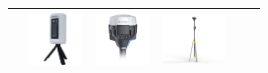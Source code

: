 \begin{table}[ht]
\begin{tabular}{|c|c|c|c|c|c|}
        \midrule\addlinespace[1.5ex]
        
        {} & \includegraphics[height=1.4cm]{Chapters/Figures/base_stations/beRTK_2.png} & \includegraphics[height=1.4cm]{Chapters/Figures/base_stations/REACH-RS2.png} & \includegraphics[height=1.4cm]{Chapters/Figures/base_stations/d-rtk-2.png}\\
		
        \bottomrule
        
	\end{tabular}
\end{table}






